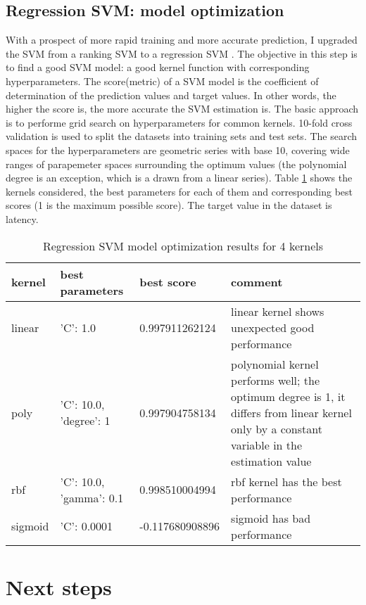 \documentclass[12pt]{article}
\theoremstyle{definition}
\begin{document}
\subsection{Regression SVM: model optimization}
With a prospect of more rapid training and more accurate prediction, I upgraded the SVM from a ranking SVM to a regression SVM \cite{chang2011libsvm}. The objective in this step is to find a good SVM model: a good kernel function with corresponding hyperparameters. The score(metric) of a SVM model is the coefficient of determination of the prediction values and target values. In other words, the higher the score is, the more accurate the SVM estimation is. The basic approach is to performe grid search on hyperparameters for common kernels. 10-fold cross validation is used to split the datasets into training sets and test sets. The search spaces for the hyperparameters are geometric series with base 10, covering wide ranges of parapemeter spaces surrounding the optimum values (the polynomial degree is an exception, which is a drawn from a linear series). Table \ref{tab:models} shows the kernels considered, the best parameters for each of them and corresponding best scores (1 is the maximum possible score). The target value in the dataset is latency.
\begin{table}[htb]
  \centering
  \begin{tabularx}{\textwidth}{|l|l|l|X|} \hline
    kernel & best parameters & best score & comment \\ \hline
    linear & {'C': 1.0} & 0.997911262124 & linear kernel shows unexpected good performance \\ \hline
    poly & {'C': 10.0, 'degree': 1} & 0.997904758134 & polynomial kernel performs well; the optimum degree is 1, it differs from linear kernel only by a constant variable in the estimation value \\ \hline
    rbf & {'C': 10.0, 'gamma': 0.1} & 0.998510004994 & rbf kernel has the best performance \\ \hline
    sigmoid & {'C': 0.0001} & -0.117680908896 & sigmoid has bad performance \\ \hline
  \end{tabularx}
  \caption{Regression SVM model optimization results for 4 kernels}
  \label{tab:models}
\end{table}

\section{Next steps}
\end{document}
